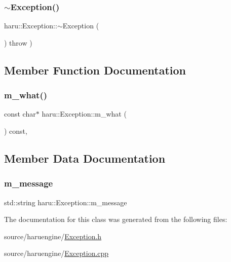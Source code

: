 \subsubsection{\texorpdfstring{$\sim$\+Exception()}{~Exception()}}
{\footnotesize\ttfamily haru\+::\+Exception\+::$\sim$\+Exception (\begin{DoxyParamCaption}{ }\end{DoxyParamCaption}) throw  ) }



\subsection{Member Function Documentation}
\mbox{\label{classharu_1_1_exception_a2b579cd90e5fcbf2894b903c3915550b}} 
\subsubsection{\texorpdfstring{m\+\_\+what()}{m\_what()}}
{\footnotesize\ttfamily const char$\ast$ haru\+::\+Exception\+::m\+\_\+what (\begin{DoxyParamCaption}{ }\end{DoxyParamCaption}) const\hspace{0.3cm}{\ttfamily [inline]}, {\ttfamily [noexcept]}}



\subsection{Member Data Documentation}
\mbox{\label{classharu_1_1_exception_a923972934d42b96a2af6f98668f757aa}} 
\subsubsection{\texorpdfstring{m\+\_\+message}{m\_message}}
{\footnotesize\ttfamily std\+::string haru\+::\+Exception\+::m\+\_\+message\hspace{0.3cm}{\ttfamily [private]}}



The documentation for this class was generated from the following files\+:\begin{DoxyCompactItemize}
\item 
source/haruengine/\mbox{\hyperlink{_exception_8h}{Exception.\+h}}\item 
source/haruengine/\mbox{\hyperlink{_exception_8cpp}{Exception.\+cpp}}\end{DoxyCompactItemize}

